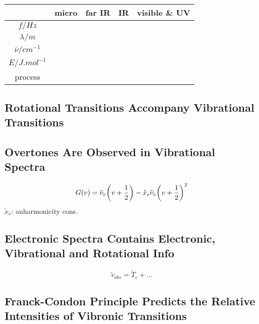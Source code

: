 \documentclass[a4paper]{article}
\numberwithin{equation}{section}
\begin{document}
\subsection{}
\begin{table}[H]
	\centering
	\begin{tabular}{ccccc}
		\hline
		& micro & far IR & IR & visible \& UV  \\ \hline
		$ f/\si{Hz} $ &  & & &\\
		$ \lambda/\si{m} $ &  & & &\\
		$ \bar{\nu}/\si{cm^{-1}} $ &&&&\\
		$ E/\si{J.mol^{-1}} $ &  & & &\\
		process &  & & &\\
		\hline
	\end{tabular}
	\caption{}
\end{table}

\subsection{Rotational Transitions Accompany Vibrational Transitions}

\subsection{}
\subsection{}
\subsection{Overtones Are Observed in Vibrational Spectra}
\begin{equation}\label{key}
G(v) = \tilde\nu_e \qty(v + \dfrac{1}{2}) - \tilde{x}_e\tilde{\nu}_e\qty(v + \dfrac{1}{2})^2
\end{equation}
$ \tilde{x}_e $: anharmonicity cons.

\subsection{Electronic Spectra Contains Electronic, Vibrational and Rotational Info}
\begin{equation}\label{key}
\tilde{v}_{obs} = \tilde{T}_e + ...
\end{equation}

\subsection{Franck-Condon Principle Predicts the Relative Intensities of Vibronic Transitions}
\end{document}
